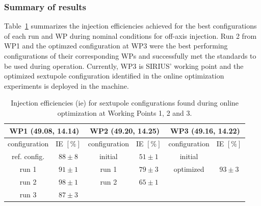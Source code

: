\subsubsection{Summary of results}
Table~\ref{tb:summary} summarizes the injection efficiencies achieved for the best configurations of each run and WP during nominal conditions for off-axis injection. Run 2 from \gls*{WP1} and the optimzed configuration at \gls*{WP3} were the best performing configurations of their corresponding WPs and successfully met the standards to be used during operation. Currently, \gls*{WP3} is SIRIUS' working point and the optimized sextupole configuration identified in the online optimization experiments is deployed in the machine.
\begin{table}[htb]
    \centering
    \caption[Injection efficiencies for sextupole configurations found during online optimization at Working Points 1, 2 and 3.]{Injection efficiencies (\gls*{ie}) for sextupole configurations found during online optimization at Working Points 1, 2 and 3.}
    \begin{tabular}{cccccc}
    \hline
    \multicolumn{2}{c}{\gls*{WP1} (49.08, 14.14)} & \multicolumn{2}{c}{\gls*{WP2} (49.20, 14.25)}         & \multicolumn{2}{c}{\gls*{WP3} (49.16, 14.22)}         \\ \hline
    configuration      & IE $[\%]$      & configuration        & IE $[\%]$            & configuration        & IE $[\%]$            \\ \hline
    ref. config.       & $88\pm8$       & initial              & $51\pm1$             & initial              &                      \\
    run 1              & $91\pm1$       & run 1                & $79\pm3$             & optimized            & $93\pm3$             \\
    run 2              & $98\pm1$       & run 2                & $65\pm1    $         &                      &                      \\
    run 3              & $87\pm3$       & \multicolumn{1}{l}{} & \multicolumn{1}{l}{} & \multicolumn{1}{l}{} & \multicolumn{1}{l}{} \\ \hline
    \end{tabular}
    \label{tb:summary}
    \end{table}
